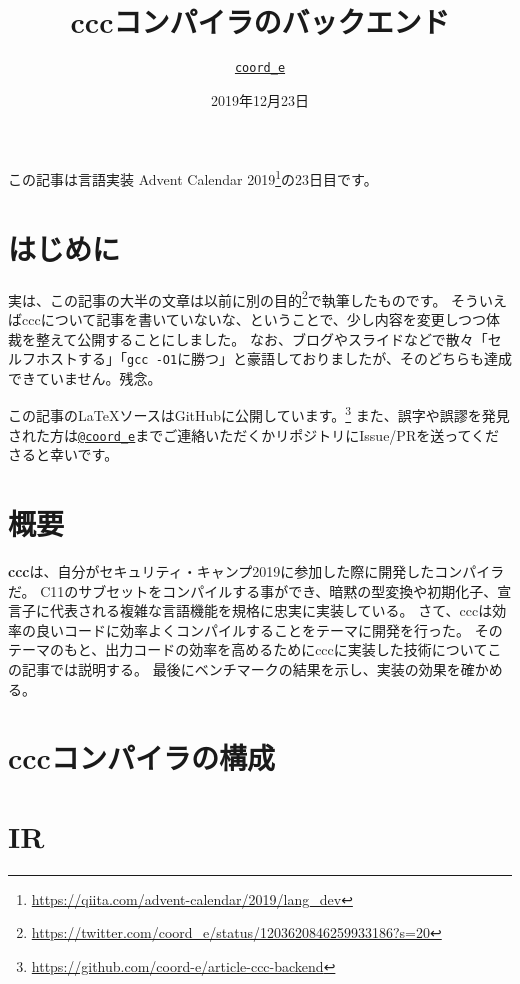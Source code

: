 \documentclass[uplatex,a4paper]{jsarticle}
\title{cccコンパイラのバックエンド}
\author{\href{https://keybase.io/coorde}{\texttt{coord\_e}}}
\date{2019年12月23日}
\begin{document}
\maketitle

\setcounter{page}{1}

この記事は言語実装 Advent Calendar 2019\footnote{\url{https://qiita.com/advent-calendar/2019/lang_dev}}の23日目です。

\section{はじめに}

実は、この記事の大半の文章は以前に別の目的\footnote{\url{https://twitter.com/coord_e/status/1203620846259933186?s=20}}で執筆したものです。
そういえばcccについて記事を書いていないな、ということで、少し内容を変更しつつ体裁を整えて公開することにしました。
なお、ブログやスライドなどで散々「セルフホストする」「\texttt{gcc -O1}に勝つ」と豪語しておりましたが、そのどちらも達成できていません。残念。

この記事の\LaTeX ソースはGitHubに公開しています。\footnote{\url{https://github.com/coord-e/article-ccc-backend}}
また、誤字や誤謬を発見された方は\href{https://twitter.com/coord_e}{\texttt{@coord\_e}}までご連絡いただくかリポジトリにIssue/PRを送ってくださると幸いです。

\section {概要}
\label{ccc_abstract}

\textbf{ccc}は、自分がセキュリティ・キャンプ2019\cite{seccamp19}に参加した際に開発したコンパイラだ。
C11のサブセットをコンパイルする事ができ、暗黙の型変換や初期化子、宣言子に代表される複雑な言語機能を規格に忠実に実装している。
さて、cccは効率の良いコードに効率よくコンパイルすることをテーマに開発を行った。
そのテーマのもと、出力コードの効率を高めるためにcccに実装した技術についてこの記事では説明する。
最後にベンチマークの結果を示し、実装の効果を確かめる。

\section{cccコンパイラの構成}


\clearpage
\section{IR}
\label{ccc_ir}

\end{document}
